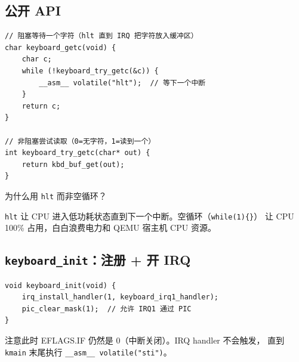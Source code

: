 \subsection{公开 API}

\begin{lstlisting}[style=cstyle]
// 阻塞等待一个字符（hlt 直到 IRQ 把字符放入缓冲区）
char keyboard_getc(void) {
    char c;
    while (!keyboard_try_getc(&c)) {
        __asm__ volatile("hlt");  // 等下一个中断
    }
    return c;
}

// 非阻塞尝试读取（0=无字符，1=读到一个）
int keyboard_try_getc(char* out) {
    return kbd_buf_get(out);
}
\end{lstlisting}

\begin{whybox}
为什么用 \texttt{hlt} 而非空循环？

\texttt{hlt} 让 CPU 进入低功耗状态直到下一个中断。空循环（\texttt{while(1)\{\}}）
让 CPU 100\% 占用，白白浪费电力和 QEMU 宿主机 CPU 资源。
\end{whybox}

\subsection{\texttt{keyboard\_init}：注册 + 开 IRQ}

\begin{lstlisting}[style=cstyle]
void keyboard_init(void) {
    irq_install_handler(1, keyboard_irq1_handler);
    pic_clear_mask(1);  // 允许 IRQ1 通过 PIC
}
\end{lstlisting}

注意此时 EFLAGS.IF 仍然是 0（中断关闭）。IRQ handler 不会触发，
直到 \texttt{kmain} 末尾执行 \texttt{\_\_asm\_\_ volatile("sti")}。


